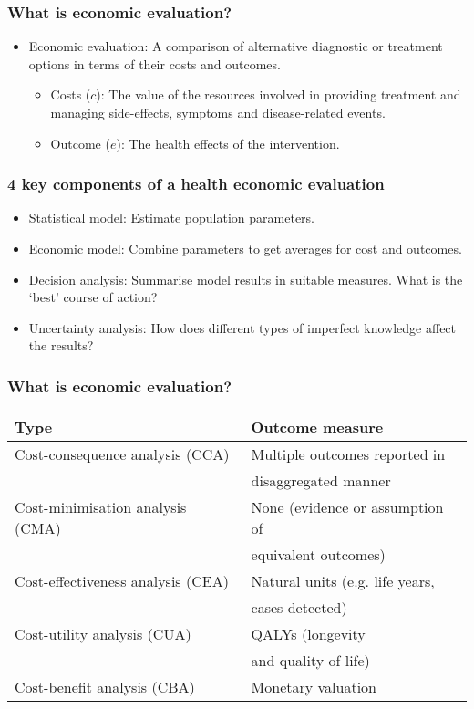 \documentclass[t]{beamer}
\begin{document}
\begin{frame}
\frametitle{What is economic evaluation?}
	\begin{itemize}
	\item Economic evaluation: A comparison of alternative diagnostic or treatment options in terms of their \alert{costs} and \alert{outcomes}.

		\begin{itemize}
			\item \alert{Costs ($c$)}: The value of the resources involved in providing treatment and managing side-effects, symptoms and disease-related events.
			\item \alert{Outcome ($e$)}: The health effects of the intervention.
		\end{itemize}
	\end{itemize}
\end{frame}

\begin{frame}
\frametitle{4 key components of a health economic evaluation}
\begin{itemize}
	\pause
	\item \alert{Statistical model}: Estimate population parameters.
	\pause
	\item \alert{Economic model}: Combine parameters to get averages for cost and outcomes.
	\pause
	\item \alert{Decision analysis}: Summarise model results in suitable measures. What is the `best' course of action?
	\pause
	\item \alert{Uncertainty analysis}: How does different types of imperfect knowledge affect the results?
\end{itemize}
\end{frame}


\begin{frame}
\frametitle{What is economic evaluation?}
\begin{table}
	\centering
		\begin{tabular}{l l}
		\hline
\textbf{Type} & \textbf{Outcome measure} \\
\hline \hline
Cost-\alert{consequence} analysis
(CCA) & Multiple outcomes reported in\\
&disaggregated manner\\
Cost-\alert{minimisation} analysis
(CMA) & None (evidence or assumption of\\
&equivalent outcomes)\\
Cost-\alert{effectiveness} analysis
(CEA) & Natural units (e.g. life years,\\
 &cases detected)\\
Cost-\alert{utility} analysis (CUA) & QALYs (longevity \\
&and quality of life)\\
Cost-\alert{benefit} analysis
(CBA) & Monetary valuation\\
\hline
		\end{tabular}
\end{table}
\end{frame}
\end{document}
